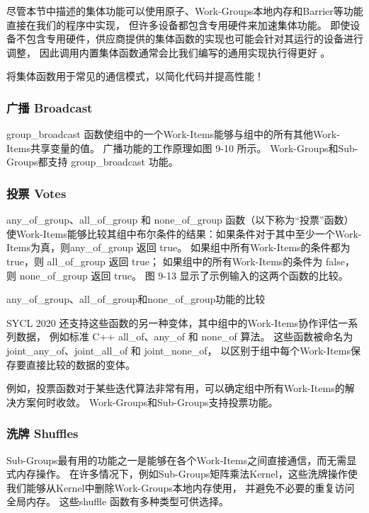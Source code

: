 尽管本节中描述的集体功能可以使用原子、Work-Groups本地内存和Barrier等功能直接在我们的程序中实现，
但许多设备都包含专用硬件来加速集体功能。 
即使设备不包含专用硬件，供应商提供的集体函数的实现也可能会针对其运行的设备进行调整，
因此调用内置集体函数通常会比我们编写的通用实现执行得更好 。

\begin{remark}
	将集体函数用于常见的通信模式，以简化代码并提高性能！
\end{remark}

\subsubsection{广播 Broadcast}
group\_broadcast 函数使组中的一个Work-Items能够与组中的所有其他Work-Items共享变量的值。 
广播功能的工作原理如图 9-10 所示。 Work-Groups和Sub-Groups都支持 group\_broadcast 功能。

\subsubsection{投票 Votes}
any\_of\_group、all\_of\_group 和 none\_of\_group 函数（以下称为“投票”函数）
使Work-Items能够比较其组中布尔条件的结果：如果条件对于其中至少一个Work-Items为真，则any\_of\_group 返回 true。 
如果组中所有Work-Items的条件都为 true，则 all\_of\_group 返回 true；
如果组中的所有Work-Items的条件为 false，则 none\_of\_group 返回 true。 
图 9-13 显示了示例输入的这两个函数的比较。

{\color{red} any\_of\_group、all\_of\_group和none\_of\_group功能的比较}

SYCL 2020 还支持这些函数的另一种变体，其中组中的Work-Items协作评估一系列数据，
例如标准 C++ all\_of、any\_of 和 none\_of 算法。 
这些函数被命名为 joint\_any\_of、joint\_all\_of 和 joint\_none\_of，
以区别于组中每个Work-Items保存要直接比较的数据的变体。

例如，投票函数对于某些迭代算法非常有用，可以确定组中所有Work-Items的解决方案何时收敛。 
Work-Groups和Sub-Groups支持投票功能。

\subsubsection{洗牌 Shuffles}
Sub-Groups最有用的功能之一是能够在各个Work-Items之间直接通信，而无需显式内存操作。 
在许多情况下，例如Sub-Groups矩阵乘法Kernel，这些洗牌操作使我们能够从Kernel中删除Work-Groups本地内存使用，
并避免不必要的重复访问全局内存。 这些shuffle 函数有多种类型可供选择。

